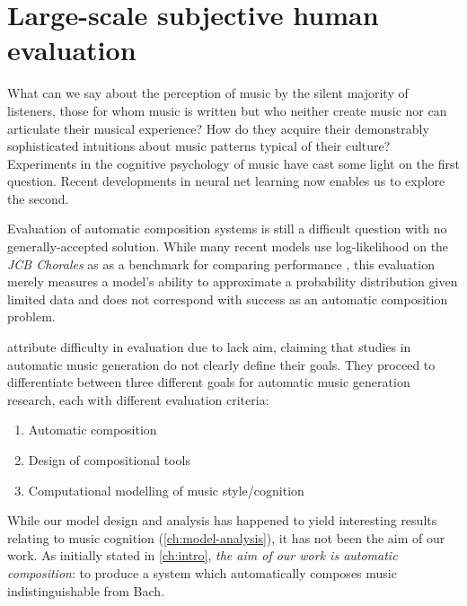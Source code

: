 \chapter{Large-scale subjective human evaluation}\label{ch:evaluation}
\begin{savequote}[75mm]
  What can we say about the perception of music by the silent majority of
  listeners, those for whom music is written but who neither create music nor
  can articulate their musical experience? How do they acquire their
  demonstrably sophisticated intuitions about music patterns
  typical of their culture? Experiments in the cognitive psychology of music
  have cast some light on the first question. Recent developments in neural net learning
  now enables us to explore the second.
\end{savequote}


\ifpdf
    \graphicspath{{Chapter7/Figs/Raster/}{Chapter7/Figs/PDF/}{Chapter7/Figs/}}
\else
    \graphicspath{{Chapter7/Figs/Vector/}{Chapter7/Figs/}}
\fi

Evaluation of automatic composition systems is still a difficult question with
no generally-accepted solution. While many recent models use log-likelihood on
the \textit{JCB Chorales} \citep{Allan2005} as as a benchmark for comparing
performance
\citep{Boulanger-Lewandowski2012,bayer2013fast,pascanu2013construct,goel2014polyphonic,zaremba2015empirical,Lyu2015},
this evaluation merely measures a model's ability to approximate a probability
distribution given limited data and does not correspond with success as an
automatic composition problem.

\citet{pearce2001towards,pearce2002motivations} attribute difficulty in
evaluation due to lack aim, claiming that studies in automatic music generation
do not clearly define their goals. They proceed to differentiate between three
different goals for automatic music generation research, each with different
evaluation criteria:
\begin{enumerate}
  \item Automatic composition
  \item Design of compositional tools
  \item Computational modelling of music style/cognition
\end{enumerate}

While our model design and analysis has happened to yield interesting results
relating to music cognition (\cref{ch:model-analysis}), it has not been the aim
of our work. As initially stated in \cref{ch:intro}, \emph{the aim of our work is
automatic composition}: to produce a system which automatically composes music
indistinguishable from Bach.

